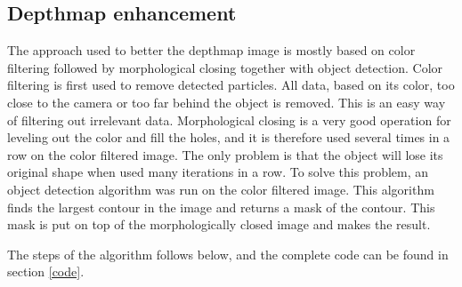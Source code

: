 

\subsection{Depthmap enhancement} \label{section:depthmap}

The approach used to better the depthmap image is mostly based on color filtering followed by morphological closing together with object detection. 
Color filtering is first used to remove detected particles. All data, based on its color, too close to the camera or too far behind the object is removed. This is an easy way of filtering out irrelevant data. Morphological closing is a very good operation for leveling out the color and fill the holes, and it is therefore used several times in a row on the color filtered image. The only problem is that the object will lose its original shape when used many iterations in a row. To solve this problem, an object detection algorithm was run on the color filtered image. This algorithm finds the largest contour in the image and returns a mask of the contour. This mask is put on top of the morphologically closed image and makes the result.

The steps of the algorithm follows below, and the complete code can be found in section \ref{code}.

